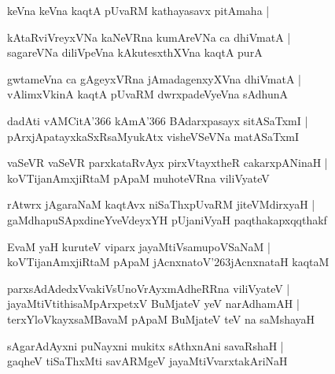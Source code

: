 keVna keVna kaqtA pUvaRM kathayasavx pitAmaha |

\begin{shloka}
kAtaRviVreyxVNa kaNeVRna kumAreVNa ca dhiVmatA |\\
sagareVNa diliVpeVna kAkutesxthXVna kaqtA purA
\end{shloka}

\begin{shloka}
gwtameVna ca gAgeyxVRna jAmadagenxyXVna dhiVmatA |\\
vAlimxVkinA kaqtA pUvaRM dwrxpadeVyeVna sAdhunA
\end{shloka}

\begin{shloka}
dadAti vAMCitA\char'366 kAmA\char'366 BAdarxpasayx sitASaTxmI |\\
pArxjApatayxkaSxRsaMyukAtx visheVSeVNa matASaTxmI
\end{shloka}

\begin{shloka}
vaSeVR vaSeVR parxkataRvAyx pirxVtayxtheR cakarxpANinaH |\\
koVTijanAmxjiRtaM pApaM muhoteVRna viliVyateV
\end{shloka}

\begin{shloka}
rAtwrx jAgaraNaM kaqtAvx niSaThxpUvaRM jiteVMdirxyaH |\\
gaMdhapuSApxdineYveVdeyxYH pUjaniVyaH paqthakapxqqthakf
\end{shloka}

\begin{shloka}
EvaM yaH kuruteV viparx jayaMtiVsamupoVSaNaM |\\
koVTijanAmxjiRtaM pApaM jAcnxnatoV\char'263jAcnxnataH kaqtaM
\end{shloka}

\begin{shloka}
parxsAdAdedxVvakiVsUnoVrAyxmAdheRRna viliVyateV |\\
jayaMtiVtithisaMpArxpetxV BuMjateV yeV narAdhamAH |\\
terxYloVkayxsaMBavaM pApaM BuMjateV teV na saMshayaH 
\end{shloka}

\begin{shloka}
sAgarAdAyxni puNayxni mukitx sAthxnAni savaRshaH |\\
gaqheV tiSaThxMti savARMgeV jayaMtiVvarxtakAriNaH 
\end{shloka}


